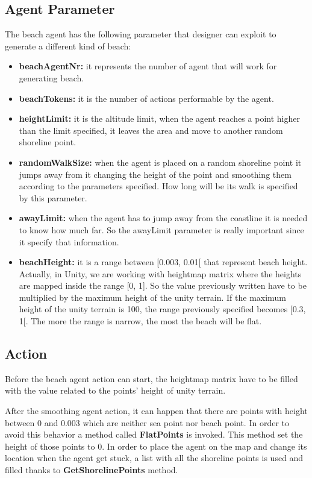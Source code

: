 \documentclass[12pt]{article}
\begin{document}
    \subsection{Agent Parameter}
    The beach agent has the following parameter that designer can exploit to generate a different kind of beach:

    \begin{itemize}
        \item \textbf{beachAgentNr:} it represents the number of agent that will work for generating beach.
        \item \textbf{beachTokens:} it is the number of actions performable by the agent.
        \item \textbf{heightLimit:} it is the altitude limit, when the agent reaches a point higher than the limit specified, it leaves the area
        and move to another random shoreline point.
        \item \textbf{randomWalkSize:} when the agent is placed on a random shoreline point it jumps away from it changing the height of
        the point and smoothing them according to the parameters specified. How long will be its walk is specified by this parameter.
        \item \textbf{awayLimit:} when the agent has to jump away from the coastline it is needed to know how much far.
        So the awayLimit parameter is really important since it specify that information.
        \item \textbf{beachHeight:} it is a range between [0.003, 0.01[ that represent beach height. Actually, in Unity, we are working with heightmap
        matrix where the heights are mapped inside the range [0, 1]. So the value previously written have to be multiplied by the maximum height of the 
        unity terrain. If the maximum height of the unity terrain is 100, the range previously specified becomes [0.3, 1[. The more the range is narrow,
        the most the beach will be flat.
    \end{itemize}

    \subsection{Action}
    Before the beach agent action can start, the heightmap matrix have to be filled with the value related to the points' height of unity terrain.
    
    \noindent
    After the smoothing agent action, it can happen that there are points with height between 0 and 0.003 which are neither sea point nor beach point. In 
    order to avoid this behavior a method called \textbf{FlatPoints} is invoked. This method set the height of those points to 0.
    In order to place the agent on the map and change its location when the agent get stuck, a list with all the shoreline points is used and filled thanks to \textbf{GetShorelinePoints}
    method.
    
\end{document}

